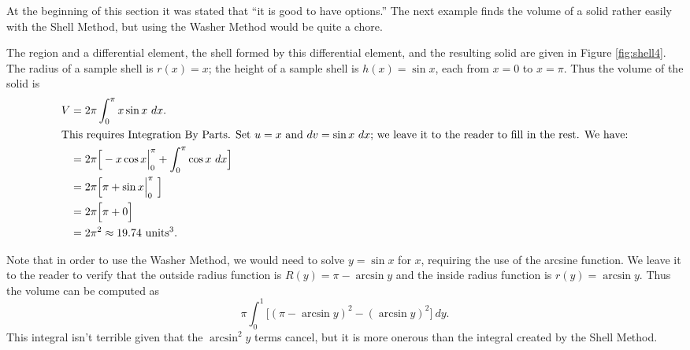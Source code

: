 At the beginning of this section it was stated that ``it is good to have options.'' The next example finds the volume of a solid rather easily with the Shell Method, but using the Washer Method would be quite a chore.\\

{The region and a differential element, the shell formed by this differential element, and the resulting solid are given in Figure \ref{fig:shell4}.
The radius of a sample shell is $r(x) = x$; the height of a sample shell is $h(x) = \sin x$, each from $x=0$ to $x=\pi$. Thus the volume of the solid is 
\begin{align*}
V &=	2\pi\int_0^{\pi} x\sin x\ dx. \\
\intertext{This requires Integration By Parts. Set $u=x$ and $dv=\sin x\ dx$; we leave it to the reader to fill in the rest. We have:}
	&= 2\pi\Big[-x\cos x\Big|_0^{\pi} +\int_0^{\pi}\cos x\ dx \Big] \\
	&= 2\pi\Big[\pi + \sin x \Big|_0^{\pi}\ \Big] \\
	&= 2\pi\Big[\pi + 0 \Big] \\
	&= 2\pi^2 \approx 19.74 \ \text{units}^3.
	\end{align*}

Note that in order to use the Washer Method, we would need to solve $y=\sin x$ for $x$, requiring the use of the arcsine function. We leave it to the reader to verify that the outside radius function is $R(y) = \pi-\arcsin y$ and the inside radius function is $r(y)=\arcsin y$. Thus the volume can be computed as $$\pi\int_0^1 \Big[ (\pi-\arcsin y)^2-(\arcsin y)^2\Big]\ dy.$$	This integral isn't terrible given that the $\arcsin^2 y$ terms cancel, but it is more onerous than the integral created by the Shell Method.
}\\

